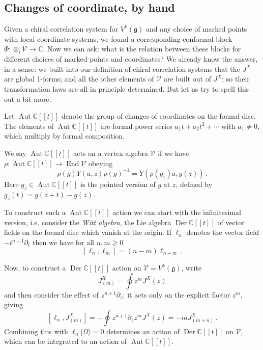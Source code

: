 \documentclass[12pt,letterpaper,reqno]{amsart}
\numberwithin{equation}{section}
\newcommand{\fg}{{\mathfrak g}}
\newcommand{\Derdisc}{\ensuremath{\Der \bbC[[t]]}}
\newcommand{\Autdisc}{\ensuremath{\Aut \bbC[[t]]}}
\newcommand{\bbC}{\ensuremath{\mathbb C}}
\newcommand\vac{{|\Omega\rangle}}
\newcommand{\vertex}{\mathcal{V}}
\newcommand{\ti}[1]{\textit{#1}}
\DeclareMathOperator{\End}{End}
\DeclareMathOperator{\Aut}{Aut}
\DeclareMathOperator{\Der}{Der}
\begin{document}
\subsection{Changes of coordinate, by hand}

Given a chiral correlation system for $V^k(\fg)$ and any choice of marked points with local coordinate systems,
we found a corresponding conformal block $\Phi: \otimes_i \vertex \to \bbC$. Now we can ask: what is the relation
between these blocks for different choices of marked points and coordinates?
We already know the answer, in a sense: we built into our definition of chiral correlation systems
that the $J^X$ are global 1-forms; and all the other elements of $\vertex$
are built out of $J^X$; so their transformation laws are all in principle determined. 
But let us try to spell this out a bit more.

Let $\Autdisc$ denote the group of changes of coordinates on the formal disc.
The elements of $\Autdisc$ are formal power series $a_1 t + a_2 t^2 + \cdots$ with $a_1 \neq 0$,
which multiply by formal composition.
\begin{defn}
We say $\Autdisc$ acts on a vertex algebra $\vertex$
if we have $\rho: \Autdisc \to \End \vertex$ obeying
\begin{equation} \label{eq:vertex-coordinate-compatibility}
  \rho(g) Y(a,z) \rho(g)^{-1} = Y(\rho(g_z) a, g(z)) \, .
\end{equation}
Here $g_z \in \Autdisc$ is the pointed version of $g$ at $z$, defined by 
$g_z(t) = g(z + t) - g(z)$.
\end{defn}


To construct such a $\Autdisc$ action
we can start with the infinitesimal version, i.e.
consider the \ti{Witt algebra}, the 
Lie algebra $\Derdisc$ of vector fields on the formal disc which
vanish at the origin.
If $\ell_n$ denotes the vector field $- t^{n+1} \partial_t$ then we have for all $n, m \ge 0$
\begin{equation} \label{eq:witt-algebra}
  [\ell_n, \ell_m] = (n-m) \ell_{n+m} \, .
\end{equation}

Now, to construct a $\Derdisc$ action on 
$\vertex = V^k(\fg)$, write
\begin{equation}
  J^X_{(m)} = \oint z^m J^X(z)  
\end{equation}
and then consider the effect of $z^{n+1} \partial_z$: it acts only on the explicit factor $z^m$,
giving
\begin{equation} \label{eq:witt-action-on-affine}
  [\ell_n, J^X_{(m)}] = -\oint z^{n+1} \partial_z z^m J^X(z) = -m J^X_{(m+n)} \, . 
\end{equation}
Combining this with $\ell_n \vac = 0$ determines an action of $\Derdisc$ on $\vertex$, which can be integrated to an action
of $\Autdisc$.
\end{document}
